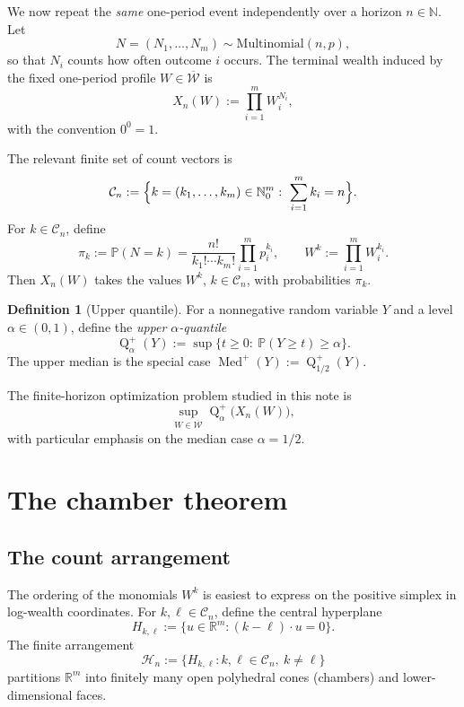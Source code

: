 \documentclass[11pt]{article}
\theoremstyle{definition}
\newtheorem{definition}[definition]{Definition}
\newcommand{\R}{\mathbb{R}}
\newcommand{\N}{\mathbb{N}}
\newcommand{\Prob}{\mathbb{P}}
\newcommand{\1}{\mathbf{1}}
\newcommand{\Med}{\operatorname{Med}}
\newcommand{\Quant}{\operatorname{Q}}
\begin{document}
We now repeat the \emph{same} one-period event independently over a horizon $n\in\N$. Let
\[
N=(N_1,\dots,N_m)\sim \mathrm{Multinomial}(n,p),
\]
so that $N_i$ counts how often outcome $i$ occurs. The terminal wealth induced by the fixed one-period profile $W\in\overline{\mathcal W}$ is
\begin{equation}\label{eq:terminal-wealth}
X_n(W):=\prod_{i=1}^m W_i^{N_i},
\end{equation}
with the convention $0^0=1$.

The relevant finite set of count vectors is
\[
\mathcal C_n:=\Bigl\{k=(k_1,\dots,k_m)\in\mathbb N_0^m:\ \sum_{i=1}^m k_i=n\Bigr\}.
\]
For $k\in\mathcal C_n$, define
\[
\pi_k:=\Prob(N=k)=\frac{n!}{k_1!\cdots k_m!}\prod_{i=1}^m p_i^{k_i},
\qquad
W^k:=\prod_{i=1}^m W_i^{k_i}.
\]
Then $X_n(W)$ takes the values $W^k$, $k\in\mathcal C_n$, with probabilities $\pi_k$.

\begin{definition}[Upper quantile]
For a nonnegative random variable $Y$ and a level $\alpha\in(0,1)$, define the \emph{upper $\alpha$-quantile}
\[
\Quant_\alpha^+(Y):=\sup\{t\ge 0:\ \Prob(Y\ge t)\ge \alpha\}.
\]
The upper median is the special case $\Med^+(Y):=\Quant_{1/2}^+(Y)$.
\end{definition}

The finite-horizon optimization problem studied in this note is
\begin{equation}\label{eq:master-problem}
\sup_{W\in\overline{\mathcal W}} \Quant_\alpha^+\bigl(X_n(W)\bigr),
\end{equation}
with particular emphasis on the median case $\alpha=1/2$.

\section{The chamber theorem}

\subsection{The count arrangement}

The ordering of the monomials $W^k$ is easiest to express on the positive simplex in log-wealth coordinates. For $k,\ell\in\mathcal C_n$, define the central hyperplane
\[
H_{k,\ell}:=\{u\in\R^m:(k-\ell)\cdot u=0\}.
\]
The finite arrangement
\[
\mathcal H_n:=\{H_{k,\ell}:k,\ell\in\mathcal C_n,\ k\ne \ell\}
\]
partitions $\R^m$ into finitely many open polyhedral cones (chambers) and lower-dimensional faces.
\end{document}
